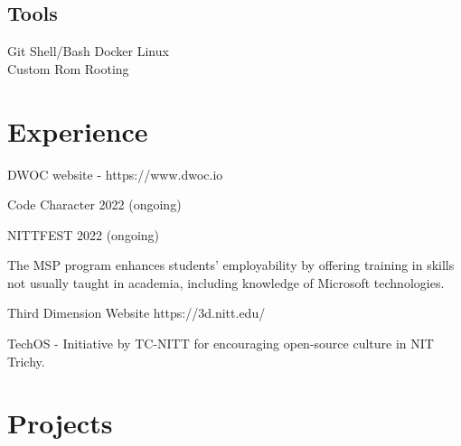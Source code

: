 \documentclass[]{deedy-resume-openfont}
\begin{document}
\begin{minipage}[t]{0.33\textwidth}
\subsection{Tools}
Git \textbullet{}   Shell/Bash \textbullet{} Docker \textbullet{} Linux \\
Custom Rom \textbullet{} Rooting \\ 
\sectionsep

%
%

\end{minipage} 
\hfill
\begin{minipage}[t]{0.66\textwidth} 

%
%
\section{Experience}
\hfill {}
\begin{tightemize}
	\item DWOC website - https://www.dwoc.io
	\item Code Character 2022 (ongoing)
	\item NITTFEST 2022 (ongoing)
\end{tightemize}
\sectionsep
{}\hfill {}
\begin{tightemize}
	\item The MSP program enhances students' employability by offering training in skills not usually taught in academia, including knowledge of Microsoft technologies.
\end{tightemize}
\sectionsep
{}\hfill {}
\begin{tightemize}
	\item Third Dimension Website https://3d.nitt.edu/
	\item TechOS - Initiative by TC-NITT for encouraging open-source culture in NIT Trichy.
\end{tightemize}
\sectionsep
%
%
\section{Projects}
\raggedright


\end{minipage}
\end{document}
